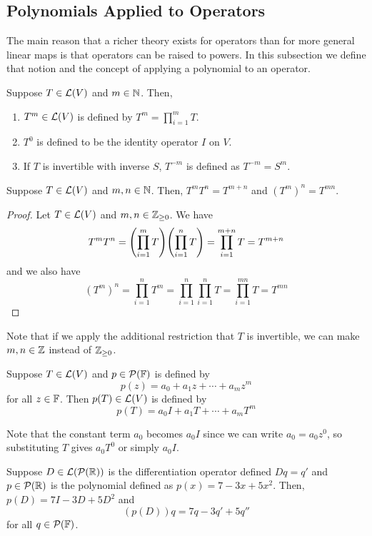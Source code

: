 \subsection*{Polynomials Applied to Operators}
The main reason that a richer theory exists for operators than for more general linear maps is that operators can be raised to powers. In this subsection we define that notion and the concept of applying a polynomial to an operator. 
\begin{definition}
    Suppose $T\in\mathcal{L}(V)$ and $m\in\mathbb{N}$. Then, 
    \begin{enumerate}
        \item $T^m \in \mathcal{L}(V)$ is defined by $T^m = \prod_{i=1}^m T$. 
        \item $T^0$ is defined to be the identity operator $I$ on $V$.
        \item If $T$ is invertible with inverse $S$, $T^{-m}$ is defined as $T^{-m} = S^m$.
    \end{enumerate}
\end{definition}
\begin{theorem}
    Suppose $T\in\mathcal{L}(V)$ and $m,n\in\mathbb{N}$. Then, $T^mT^n = T^{m+n}$ and $(T^m)^n = T^{mn}$.
\end{theorem}
\begin{proof}
    Let $T\in\mathcal{L}(V)$ and $m,n\in\mathbb{Z}_{\ge 0}$. We have
    \[ T^mT^n = \pqty{\prod_{i=1}^m T}\pqty{\prod_{i=1}^n T} = \prod_{i=1}^{m+n} T = T^{m+n} \]
    and we also have
    \[ (T^m)^n = \prod_{i=1}^n T^m = \prod_{i=1}^n \prod_{i=1}^n T = \prod_{i=1}^{mn} T = T^{mn} \]
\end{proof}
Note that if we apply the additional restriction that $T$ is invertible, we can make $m,n\in\mathbb{Z}$ instead of $\mathbb{Z}_{\ge 0}$.
\begin{definition}
    Suppose $T\in\mathcal{L}(V)$ and $p\in\mathcal{P}(\mathbb F)$ is defined by
    \[ p(z) = a_0 + a_1z + \cdots + a_mz^m \]
    for all $z\in\mathbb F$. Then $p(T)\in\mathcal{L}(V)$ is defined by
    \[ p(T) = a_0I + a_1T + \cdots + a_mT^m \]
\end{definition}
Note that the constant term $a_0$ becomes $a_0I$ since we can write $a_0 = a_0z^0$, so substituting $T$ gives $a_0T^0$ or simply $a_0I$.
\begin{example}
    Suppose $D\in\mathcal{L}(\mathcal{P}(\mathbb{R}))$ is the differentiation operator defined $Dq=q'$ and $p\in\mathcal{P}(\mathbb{R})$ is the polynomial defined as $p(x) = 7 - 3x + 5x^2$. Then, $p(D) = 7I - 3D + 5D^2$ and
    \[ (p(D))q = 7q - 3q' + 5q'' \]
    for all $q\in\mathcal{P}(\mathbb F)$.
\end{example}
